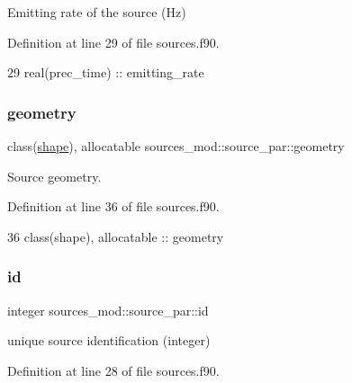 Emitting rate of the source (Hz) 



Definition at line 29 of file sources.\+f90.


\begin{DoxyCode}
29         \textcolor{keywordtype}{real(prec\_time)} :: emitting\_rate
\end{DoxyCode}
\mbox{\label{structsources__mod_1_1source__par_abf09d59fd65f02d1a8139e2f9f477207}} 
\subsubsection{\texorpdfstring{geometry}{geometry}}
{\footnotesize\ttfamily class(\mbox{\hyperlink{structgeometry__mod_1_1shape}{shape}}), allocatable sources\+\_\+mod\+::source\+\_\+par\+::geometry\hspace{0.3cm}{\ttfamily [private]}}



Source geometry. 



Definition at line 36 of file sources.\+f90.


\begin{DoxyCode}
36         \textcolor{keywordtype}{class}(shape), \textcolor{keywordtype}{allocatable} :: geometry
\end{DoxyCode}
\mbox{\label{structsources__mod_1_1source__par_a88d333946d18fee527b7b207f44dd3ff}} 
\subsubsection{\texorpdfstring{id}{id}}
{\footnotesize\ttfamily integer sources\+\_\+mod\+::source\+\_\+par\+::id\hspace{0.3cm}{\ttfamily [private]}}



unique source identification (integer) 



Definition at line 28 of file sources.\+f90.


